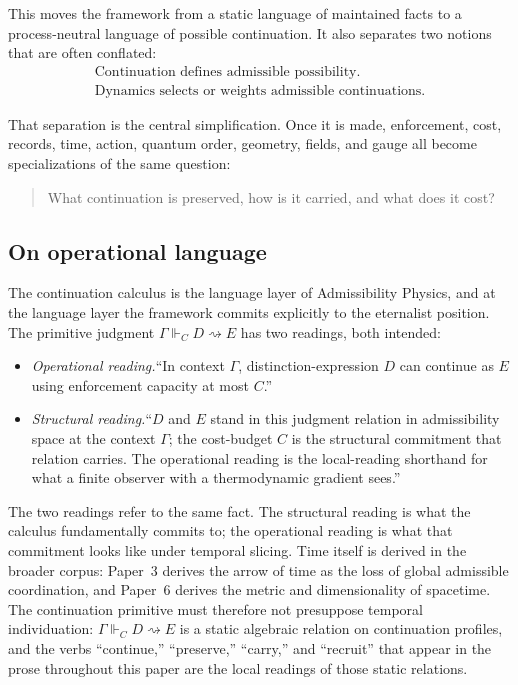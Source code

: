 \documentclass[11pt]{article}
\theoremstyle{remark}
\newcommand{\G}{\Gamma}
\newcommand{\entails}{\Vdash}
\newcommand{\goes}{\rightsquigarrow}
\begin{document}
This moves the framework from a static language of maintained facts to a process-neutral language of possible continuation.  It also separates two notions that are often conflated:
\[
\boxed{\begin{gathered}\text{Continuation defines admissible possibility.}\\ \text{Dynamics selects or weights admissible continuations.}\end{gathered}}
\]

That separation is the central simplification.  Once it is made, enforcement, cost, records, time, action, quantum order, geometry, fields, and gauge all become specializations of the same question:

\begin{quote}
What continuation is preserved, how is it carried, and what does it cost?
\end{quote}

\subsection*{On operational language}

The continuation calculus is the language layer of Admissibility Physics, and at the language layer the framework commits explicitly to the eternalist position.  The primitive judgment $\G\entails_C D\goes E$ has two readings, both intended:
\begin{itemize}
\item \emph{Operational reading.}\quad ``In context $\G$, distinction-expression $D$ can continue as $E$ using enforcement capacity at most $C$.''
\item \emph{Structural reading.}\quad ``$D$ and $E$ stand in this judgment relation in admissibility space at the context $\G$; the cost-budget $C$ is the structural commitment that relation carries.  The operational reading is the local-reading shorthand for what a finite observer with a thermodynamic gradient sees.''
\end{itemize}
The two readings refer to the same fact.  The structural reading is what the calculus fundamentally commits to; the operational reading is what that commitment looks like under temporal slicing.  Time itself is derived in the broader corpus: Paper~3 derives the arrow of time as the loss of global admissible coordination, and Paper~6 derives the metric and dimensionality of spacetime.  The continuation primitive must therefore not presuppose temporal individuation: $\G\entails_C D\goes E$ is a static algebraic relation on continuation profiles, and the verbs ``continue,'' ``preserve,'' ``carry,'' and ``recruit'' that appear in the prose throughout this paper are the local readings of those static relations.
\end{document}
